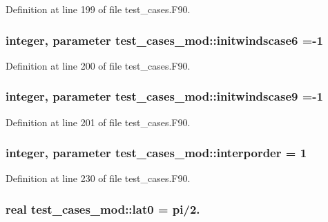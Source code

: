 Definition at line 199 of file test\-\_\-cases.\-F90.

\subsubsection[{initwindscase6}]{\setlength{\rightskip}{0pt plus 5cm}integer, parameter test\-\_\-cases\-\_\-mod\-::initwindscase6 =-\/1\hspace{0.3cm}{\ttfamily [private]}}\label{classtest__cases__mod_aefad7f694cc274e910aa9a2cd8f4635f}


Definition at line 200 of file test\-\_\-cases.\-F90.

\subsubsection[{initwindscase9}]{\setlength{\rightskip}{0pt plus 5cm}integer, parameter test\-\_\-cases\-\_\-mod\-::initwindscase9 =-\/1\hspace{0.3cm}{\ttfamily [private]}}\label{classtest__cases__mod_a4d993fcfbe5c8e8e07b74f394b8ae1b9}


Definition at line 201 of file test\-\_\-cases.\-F90.

\subsubsection[{interporder}]{\setlength{\rightskip}{0pt plus 5cm}integer, parameter test\-\_\-cases\-\_\-mod\-::interporder = 1\hspace{0.3cm}{\ttfamily [private]}}\label{classtest__cases__mod_ab921cb10723bbe2b3c15e81b664f5ff6}


Definition at line 230 of file test\-\_\-cases.\-F90.

\subsubsection[{lat0}]{\setlength{\rightskip}{0pt plus 5cm}real test\-\_\-cases\-\_\-mod\-::lat0 = pi/2.\hspace{0.3cm}{\ttfamily [private]}}\label{classtest__cases__mod_a64407c4ddac683d907f7f42813602720}


